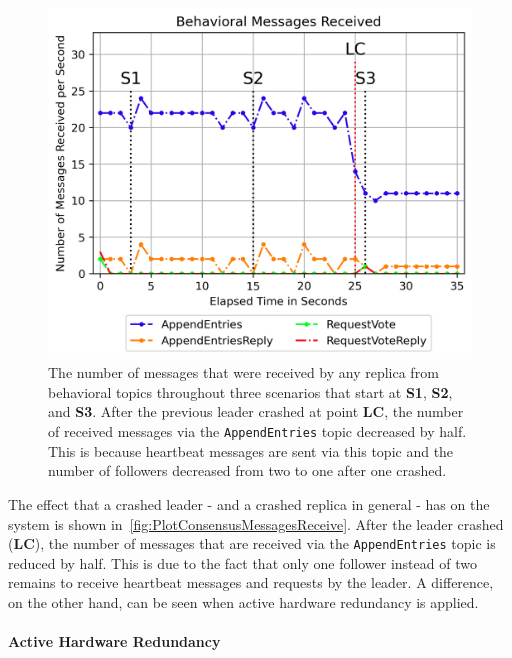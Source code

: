\begin{figure}[!hb]
	\centering
	\includegraphics[width=0.8\linewidth]{images/plots/ConsensusMessagesReceive}
	\caption{The number of messages that were received by any replica from behavioral topics throughout three scenarios that start at \textbf{S1}, \textbf{S2}, and \textbf{S3}. After the previous leader crashed at point \textbf{LC}, the number of received messages via the \texttt{AppendEntries} topic decreased by half. This is because heartbeat messages are sent via this topic and the number of followers decreased from two to one after one crashed.
}
	\label{fig:PlotConsensusMessagesReceive}
\end{figure}

The effect that a crashed leader - and a crashed replica in general - has on the system is shown in~\autoref{fig:PlotConsensusMessagesReceive}.
After the leader crashed (\textbf{LC}), the number of messages that are received via the \texttt{AppendEntries} topic is reduced by half.
This is due to the fact that only one follower instead of two remains to receive heartbeat messages and requests by the leader.
A difference, on the other hand, can be seen when active hardware redundancy is applied.


\paragraph{Active Hardware Redundancy}

